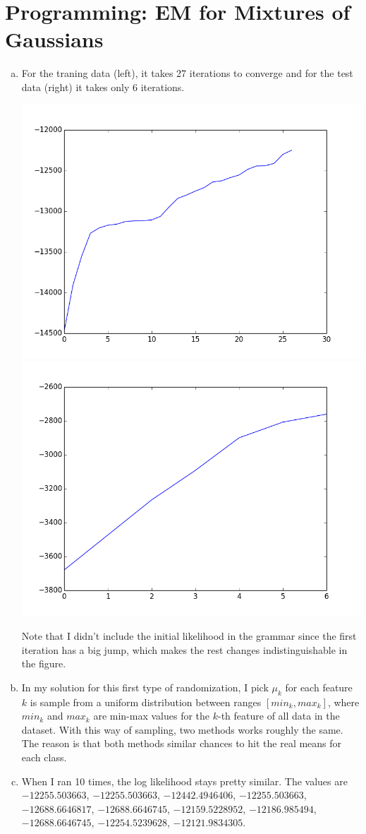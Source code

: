 \documentclass[notitlepage]{article}
\begin{document}
\section{Programming: EM for Mixtures of Gaussians}

\begin{enumerate}[(a).]
\item For the traning data (left), it takes 27 iterations to converge and for the test data (right) it takes only 6 iterations. 

\includegraphics[width=0.4\columnwidth]{figure_train.png}\includegraphics[width=0.4\columnwidth]{figure_test.png}

Note that I didn't include the initial likelihood in the grammar since the first iteration has a big jump, which makes the rest changes indistinguishable in the figure.

\item In my solution for this first type of randomization, I pick $\mu_k$ for each feature $k$ is sample from a uniform distribution between ranges $[\mathit{min}_k, \mathit{max}_k]$, where $\mathit{min}_k$ and $\mathit{max}_k$ are min-max values for the $k$-th feature of all data in the dataset. With this way of sampling, two methods works roughly the same. The reason is that both methods similar chances to hit the real means for each class.

\item When I ran 10 times, the log likelihood stays pretty similar. The values are
$-12255.503663$, $-12255.503663$, $-12442.4946406$, $-12255.503663$, $-12688.6646817$, $-12688.6646745$, $-12159.5228952$, $-12186.985494$, $-12688.6646745$, $-12254.5239628$, $-12121.9834305$.


\end{enumerate}
\end{document}
